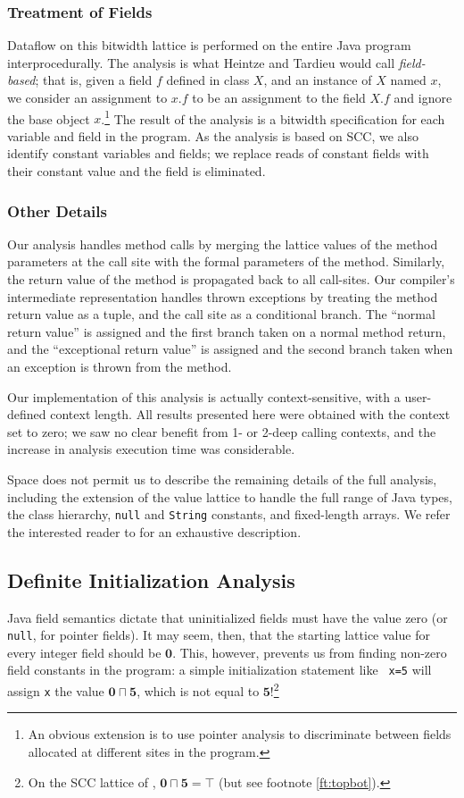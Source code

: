 \documentclass{acmconf}
\newcommand{\meet}{\ensuremath{\sqcap}}
\begin{document}
\subsubsection{Treatment of Fields}
Dataflow on this bitwidth lattice is performed on the entire Java
program interprocedurally.  The analysis is what Heintze and Tardieu
\cite{heintze01}
would call {\it field-based}; that is, given a field $f$ defined in
class $X$, and an instance of $X$ named $x$, we consider an assignment
to $x.f$ to be an assignment to the field $X.f$ and ignore the base
object $x$.\footnote{An obvious extension is to use pointer
analysis to discriminate between fields allocated at different sites
in the program.}  The result of the analysis is a bitwidth
specification for each variable and field in the program.  As the
analysis is based on SCC, we also identify constant variables and
fields; we replace reads of constant fields with their constant
value and the field is eliminated.

\subsubsection{Other Details}
Our analysis handles method calls by merging the lattice values of the
method parameters at the call site with the formal parameters of the
method.  Similarly, the return value of the method is propagated back
to all call-sites.  Our compiler's intermediate representation handles
thrown exceptions by treating the method return value as a tuple, and
the call site as a conditional branch.  The ``normal return value'' is
assigned and the first branch taken on a normal method return, and the
``exceptional return value'' is assigned and the second branch taken when an
exception is thrown from the method.

Our implementation of this analysis is actually context-sensitive,
with a user-defined context length.  All results presented here were
obtained with the context set to zero; we saw no clear benefit from 1-
or 2-deep calling contexts, and the increase in analysis execution
time was considerable.

Space does not permit us to describe the remaining details of the full
analysis, including the extension of the value
lattice to handle the full range of Java types, the class hierarchy,
{\tt null} and {\tt String} constants, and fixed-length arrays.
We refer the interested reader to \cite{ananian99:tech} for an
exhaustive description.

\subsection{Definite Initialization Analysis}
Java field semantics dictate that uninitialized fields must have
the value zero (or {\tt null}, for pointer fields).  It may seem,
then, that the starting lattice value for every integer field should
be $\mathbf{0}$.  This, however, prevents us from finding non-zero field
constants in the program: a simple initialization statement like {\tt
  x=5} will assign {\tt x} the value $\mathbf{0}\meet\mathbf{5}$,
which is not equal to $\mathbf{5}$!\footnote{On the SCC lattice of
\cite{wegman91:scc}, $\mathbf{0}\meet\mathbf{5}=\top$ (but see
footnote \ref{ft:topbot}).}
\end{document}
